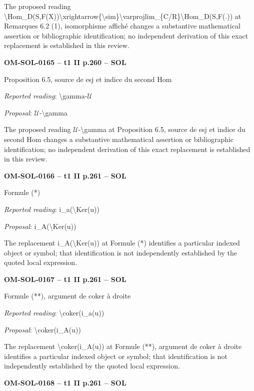The proposed reading \textbackslash{}Hom\_D(S,F(X))\textbackslash{}xrightarrow\{\textbackslash{}sim\}\textbackslash{}varprojlim\_\{C/R\}\textbackslash{}Hom\_D(S,F(.)) at Remarques 6.2 (1), isomorphisme affiché changes a substantive mathematical assertion or bibliographic identification; no independent derivation of this exact replacement is established in this review.\par
\par\noindent\textbf{OM-SOL-0165 -- t1 II p.260 -- SOL}\par
Proposition 6.5, source de esj et indice du second Hom\par
\emph{Reported reading}: \textbackslash{}gamma-\ensuremath{𝒰}\par
\emph{Proposal}: \ensuremath{𝒰}-\textbackslash{}gamma\par
The proposed reading \ensuremath{𝒰}-\textbackslash{}gamma at Proposition 6.5, source de esj et indice du second Hom changes a substantive mathematical assertion or bibliographic identification; no independent derivation of this exact replacement is established in this review.\par
\par\noindent\textbf{OM-SOL-0166 -- t1 II p.261 -- SOL}\par
Formule (*)\par
\emph{Reported reading}: i\_a(\textbackslash{}Ker(u))\par
\emph{Proposal}: i\_A(\textbackslash{}Ker(u))\par
The replacement i\_A(\textbackslash{}Ker(u)) at Formule (*) identifies a particular indexed object or symbol; that identification is not independently established by the quoted local expression.\par
\par\noindent\textbf{OM-SOL-0167 -- t1 II p.261 -- SOL}\par
Formule (**), argument de coker à droite\par
\emph{Reported reading}: \textbackslash{}coker(i\_a(u))\par
\emph{Proposal}: \textbackslash{}coker(i\_A(u))\par
The replacement \textbackslash{}coker(i\_A(u)) at Formule (**), argument de coker à droite identifies a particular indexed object or symbol; that identification is not independently established by the quoted local expression.\par
\par\noindent\textbf{OM-SOL-0168 -- t1 II p.261 -- SOL}\par
